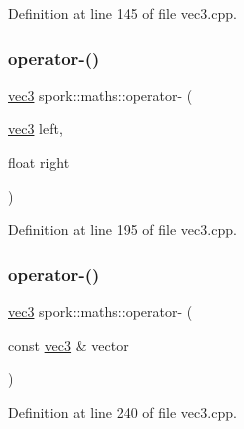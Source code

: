 Definition at line 145 of file vec3.\+cpp.

\mbox{\label{namespacespork_1_1maths_abd740168ef44d890eb3795658292a623}} 
\subsubsection{\texorpdfstring{operator-\/()}{operator-()}\hspace{0.1cm}{\footnotesize\ttfamily [4/5]}}
{\footnotesize\ttfamily \hyperlink{structspork_1_1maths_1_1vec3}{vec3} spork\+::maths\+::operator-\/ (\begin{DoxyParamCaption}\item[{\hyperlink{structspork_1_1maths_1_1vec3}{vec3}}]{left,  }\item[{float}]{right }\end{DoxyParamCaption})}



Definition at line 195 of file vec3.\+cpp.

\mbox{\label{namespacespork_1_1maths_a7be5d02ef2f6c8395af8a6ecb0aaa382}} 
\subsubsection{\texorpdfstring{operator-\/()}{operator-()}\hspace{0.1cm}{\footnotesize\ttfamily [5/5]}}
{\footnotesize\ttfamily \hyperlink{structspork_1_1maths_1_1vec3}{vec3} spork\+::maths\+::operator-\/ (\begin{DoxyParamCaption}\item[{const \hyperlink{structspork_1_1maths_1_1vec3}{vec3} \&}]{vector }\end{DoxyParamCaption})}



Definition at line 240 of file vec3.\+cpp.

\mbox{\label{namespacespork_1_1maths_ae491f51c3cf643faf35f44368b88a385}} 

